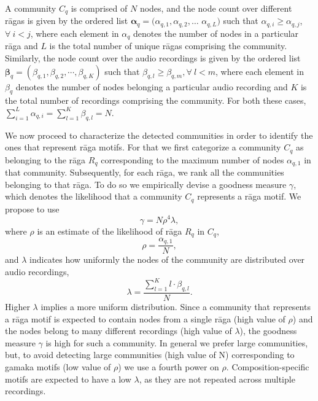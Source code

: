 A community $C_q$ is comprised of $N$ nodes, and the node count over different r\={a}gas is given by the ordered list ${\boldsymbol{\alpha}_q} = (\alpha_{q,1}, \alpha_{q,2},\dots$ $\alpha_{q,L})$ such that $\alpha_{q,i} \geq \alpha_{q,j}$, $\forall~ i < j$,
where each element in $\alpha_{q}$ denotes the number of nodes in a particular r\={a}ga and $L$ is the total number of unique r\={a}gas comprising the community. Similarly, the node count over the audio recordings is given by the ordered list ${\boldsymbol{\beta}_q} = (\beta_{q,1}, \beta_{q,2},\cdots,\beta_{q,K})$ such that $\beta_{q,l} \geq \beta_{q,m}, \forall~l < m$,  where each element in $\beta_{q}$ denotes the number of nodes belonging a particular audio recording and $K$ is the total number of recordings comprising the community. For both these cases, $\sum_{i=1}^{L}\alpha_{q,i} = \sum_{l=1}^{K}\beta_{q,l} = N$.

We now proceed to characterize the detected communities in order to identify the ones that represent r\={a}ga motifs. For that we first categorize a community $C_q$ as belonging to the r\={a}ga $R_q$ corresponding to the maximum number of nodes $\alpha_{q,1}$ in that community. Subsequently, for each r\={a}ga, we rank all the communities belonging to that r\={a}ga. To do so we empirically devise a goodness measure $\gamma$, which denotes the likelihood that a community $C_q$ represents a r\={a}ga motif. We propose to use
\vspace{-0.5em}
\begin{equation}
\gamma = N \rho^4 \lambda,
\label{eq:gamma}
\end{equation}
where $\rho$ is an estimate of the likelihood of r\={a}ga $R_q$ in $C_q$, 
\begin{equation}
\rho = \frac{\alpha_{q,1}}{N},
\end{equation}
and $\lambda$ indicates how uniformly the nodes of the community are distributed over audio recordings,
\vspace{-0.5em}
\begin{equation}
\lambda = \frac{\sum_{l=1}^{K}l \cdot \beta_{q,l}}{N}.
\end{equation}
Higher $\lambda$ implies a more uniform distribution. Since a community that represents a r\={a}ga motif is expected to contain nodes from a single r\={a}ga (high value of $\rho$) and the nodes belong to many different recordings (high value of $\lambda$), the goodness measure $\gamma$ is high for such a community. In general we prefer large communities, but, to avoid detecting large communities (high value of N) corresponding to gamaka motifs (low value of $\rho$) we use a fourth power on $\rho$. Composition-specific motifs are expected to have a low $\lambda$, as they are not repeated across multiple recordings.

